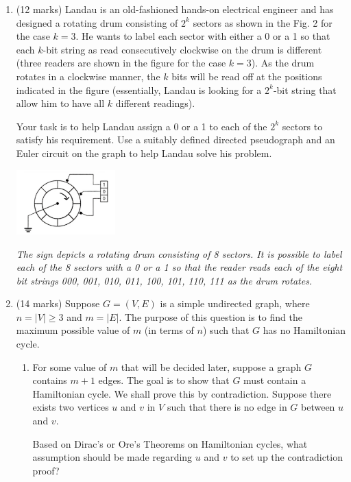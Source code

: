 \documentclass{article}
\begin{document}
\begin{enumerate}[label=(\alph*)]
    \item (12 marks) Landau is an old-fashioned hands-on electrical engineer and has designed a rotating drum consisting of $2^k$ sectors as shown in the Fig. 2 for the case $k = 3$. He wants to label each sector with either a 0 or a 1 so that each $k$-bit string as read consecutively clockwise on the drum is different (three readers are shown in the ﬁgure for the case $k = 3$). As the drum rotates in a clockwise manner, the $k$ bits will be read off at the positions indicated in the ﬁgure (essentially, Landau is looking for a $2^k$-bit string that allow him to have all $k$ different readings).

          Your task is to help Landau assign a 0 or a 1 to each of the $2^k$ sectors to satisfy his requirement. Use a suitably deﬁned directed pseudograph and an Euler circuit on the graph to help Landau solve his problem.

          \includegraphics[width=0.3\textwidth]{5-fig-2.png}

          \textit{The sign depicts a rotating drum consisting of 8 sectors. It is possible to label each of the 8 sectors with a 0 or a 1 so that the reader reads each of the eight bit strings 000, 001, 010, 011, 100, 101, 110, 111 as the drum rotates.}

    \item (14 marks) Suppose $G = (V, E)$ is a simple undirected graph, where $n = |V| \geq 3$ and $m = |E|$. The purpose of this question is to find the maximum possible value of $m$ (in terms of $n$) such that $G$ has no Hamiltonian cycle.

          \begin{enumerate}[label=(\roman*)]
              \item For some value of $m$ that will be decided later, suppose a graph $G$ contains $m + 1$ edges. The goal is to show that $G$ must contain a Hamiltonian cycle. We shall prove this by contradiction. Suppose there exists two vertices $u$ and $v$ in $V$ such that there is no edge in $G$ between $u$ and $v$.

                    Based on Dirac’s or Ore’s Theorems on Hamiltonian cycles, what assumption should be made regarding $u$ and $v$ to set up the contradiction proof?


\end{enumerate}
\end{enumerate}
\end{document}
